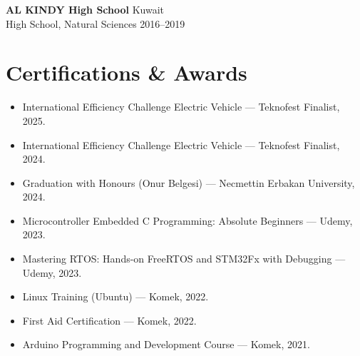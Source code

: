 \documentclass[a4paper,10pt]{article}
\begin{document}
\vspace{4pt}
\textbf{AL KINDY High School} \hfill Kuwait\\
High School, Natural Sciences \hfill 2016--2019

\section*{Certifications \& Awards}
\begin{itemize}
  \item International Efficiency Challenge Electric Vehicle --- Teknofest Finalist, 2025.
  \item International Efficiency Challenge Electric Vehicle --- Teknofest Finalist, 2024.
  \item Graduation with Honours (Onur Belgesi) --- Necmettin Erbakan University, 2024.
  \item Microcontroller Embedded C Programming: Absolute Beginners --- Udemy, 2023.
  \item Mastering RTOS: Hands-on FreeRTOS and STM32Fx with Debugging --- Udemy, 2023.
  \item Linux Training (Ubuntu) --- Komek, 2022.
  \item First Aid Certification --- Komek, 2022.
  \item Arduino Programming and Development Course --- Komek, 2021.
\end{itemize}
\end{document}

